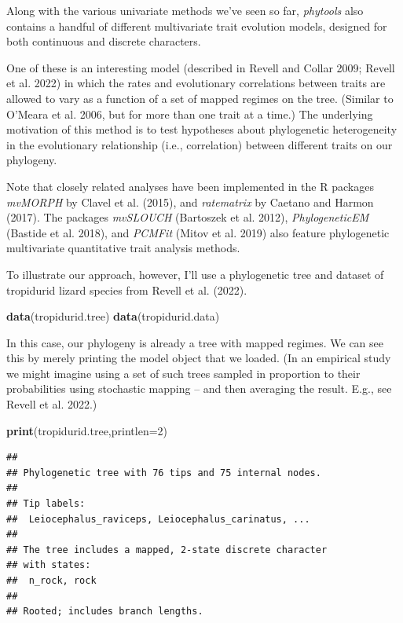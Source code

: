 \documentclass[fleqn,10pt,lineno]{wlpeerj} %
\newenvironment{Shaded}{\begin{snugshade}}{\end{snugshade}}
\newcommand{\AttributeTok}[1]{\textcolor[rgb]{0.13,0.29,0.53}{#1}}
\newcommand{\DecValTok}[1]{\textcolor[rgb]{0.00,0.00,0.81}{#1}}
\newcommand{\FunctionTok}[1]{\textcolor[rgb]{0.13,0.29,0.53}{\textbf{#1}}}
\newcommand{\NormalTok}[1]{#1}
\begin{document}
Along with the various univariate methods we've seen so far, \emph{phytools} also contains a handful of different multivariate trait evolution models, designed for both continuous and discrete characters.

One of these is an interesting model (described in Revell and Collar 2009; Revell et al. 2022) in which the rates and evolutionary correlations between traits are allowed to vary as a function of a set of mapped regimes on the tree. (Similar to O'Meara et al. 2006, but for more than one trait at a time.) The underlying motivation of this method is to test hypotheses about phylogenetic heterogeneity in the evolutionary relationship (i.e., correlation) between different traits on our phylogeny.

Note that closely related analyses have been implemented in the R packages \emph{mvMORPH} by Clavel et al. (2015), and \emph{ratematrix} by Caetano and Harmon (2017). The packages \emph{mvSLOUCH} (Bartoszek et al. 2012), \emph{PhylogeneticEM} (Bastide et al. 2018), and \emph{PCMFit} (Mitov et al. 2019) also feature phylogenetic multivariate quantitative trait analysis methods.

To illustrate our approach, however, I'll use a phylogenetic tree and dataset of tropidurid lizard species from Revell et al. (2022).

\begin{Shaded}
\begin{Highlighting}[]
\FunctionTok{data}\NormalTok{(tropidurid.tree)}
\FunctionTok{data}\NormalTok{(tropidurid.data)}
\end{Highlighting}
\end{Shaded}

In this case, our phylogeny is already a tree with mapped regimes. We can see this by merely printing the model object that we loaded. (In an empirical study we might imagine using a set of such trees sampled in proportion to their probabilities using stochastic mapping -- and then averaging the result. E.g., see Revell et al. 2022.)

\begin{Shaded}
\begin{Highlighting}[]
\FunctionTok{print}\NormalTok{(tropidurid.tree,}\AttributeTok{printlen=}\DecValTok{2}\NormalTok{)}
\end{Highlighting}
\end{Shaded}

\begin{verbatim}
## 
## Phylogenetic tree with 76 tips and 75 internal nodes.
## 
## Tip labels:
##  Leiocephalus_raviceps, Leiocephalus_carinatus, ...
## 
## The tree includes a mapped, 2-state discrete character
## with states:
##  n_rock, rock
## 
## Rooted; includes branch lengths.
\end{verbatim}
\end{document}
